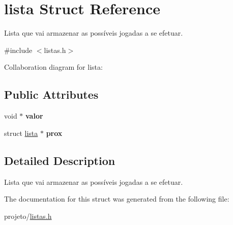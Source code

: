 \hypertarget{structlista}{}\section{lista Struct Reference}
\label{structlista}


Lista que vai armazenar as possíveis jogadas a se efetuar.  




{\ttfamily \#include $<$listas.\+h$>$}



Collaboration diagram for lista\+:
\subsection*{Public Attributes}
\begin{DoxyCompactItemize}
\item 
\mbox{\label{structlista_a1851230b0237deef0519ee33de9f2dd0}} 
void $\ast$ {\bfseries valor}
\item 
\mbox{\label{structlista_a3b0e375147c1163d74544fd206a1f1de}} 
struct \hyperlink{structlista}{lista} $\ast$ {\bfseries prox}
\end{DoxyCompactItemize}


\subsection{Detailed Description}
Lista que vai armazenar as possíveis jogadas a se efetuar. 

The documentation for this struct was generated from the following file\+:\begin{DoxyCompactItemize}
\item 
projeto/\hyperlink{listas_8h}{listas.\+h}\end{DoxyCompactItemize}
